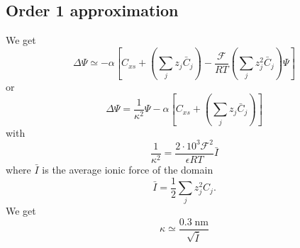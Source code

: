 \documentclass{revtex4}
\begin{document}
\subsection{Order 1 approximation}
We get
\begin{equation}
	\Delta \Psi 
	\simeq -\alpha \left[ 	C_{xs} 
							+\left(\sum_j{z_j\bar{C}_j}\right)
							- \dfrac{\mathcal{F}}{RT}\left(\sum_j z_j^2\bar{C}_j\right) \Psi
							\right]
\end{equation}
or
\begin{equation}
	\Delta \Psi = \dfrac{1}{\kappa^2} \Psi - \alpha 	\left[ 	C_{xs} 
							+\left(\sum_j{z_j\bar{C}_j}\right) \right]
\end{equation}
with
\begin{equation}
	\dfrac{1}{\kappa^2} = \dfrac{2\cdot10^{3}\mathcal{F}^2}{\epsilon RT}\bar{I}
\end{equation}
where $\bar{I}$ is the average ionic force of the domain
$$
	\bar{I} = \dfrac{1}{2} \sum_j z_j^2 C_j.
$$
We get
\begin{equation}
	\kappa \simeq \dfrac{0.3\;\mathrm{nm}}{\sqrt{\bar{I}}}
\end{equation}
\end{document}
